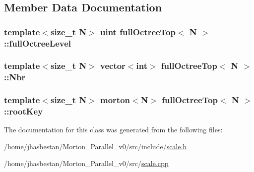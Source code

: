 \subsection{Member Data Documentation}
\hypertarget{classfullOctreeTop_a15287409a42ab0318bea9c8312d7736f}{
\subsubsection[{fullOctreeLevel}]{\setlength{\rightskip}{0pt plus 5cm}template$<$size\_\-t N$>$ uint {\bf fullOctreeTop}$<$ N $>$::{\bf fullOctreeLevel}}}
\label{classfullOctreeTop_a15287409a42ab0318bea9c8312d7736f}
\hypertarget{classfullOctreeTop_a2a6819a1dafdbb62deed31d3365603b5}{
\subsubsection[{Nbr}]{\setlength{\rightskip}{0pt plus 5cm}template$<$size\_\-t N$>$ vector$<$int$>$ {\bf fullOctreeTop}$<$ N $>$::{\bf Nbr}}}
\label{classfullOctreeTop_a2a6819a1dafdbb62deed31d3365603b5}
\hypertarget{classfullOctreeTop_a77b39b1cd91efb3fbbb1f99fe59567d1}{
\subsubsection[{rootKey}]{\setlength{\rightskip}{0pt plus 5cm}template$<$size\_\-t N$>$ morton$<$N$>$ {\bf fullOctreeTop}$<$ N $>$::{\bf rootKey}}}
\label{classfullOctreeTop_a77b39b1cd91efb3fbbb1f99fe59567d1}


The documentation for this class was generated from the following files:\begin{DoxyCompactItemize}
\item 
/home/jhasbestan/Morton\_\-Parallel\_\-v0/src/include/\hyperlink{scale_8h}{scale.h}\item 
/home/jhasbestan/Morton\_\-Parallel\_\-v0/src/\hyperlink{scale_8cpp}{scale.cpp}\end{DoxyCompactItemize}
